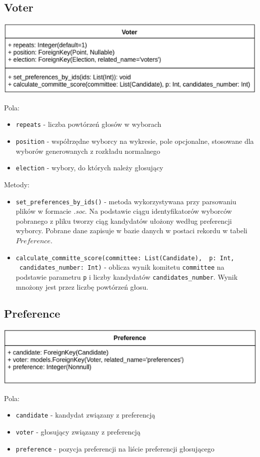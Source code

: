\documentclass[pdflatex,11pt]{../aghdoc_version2}
\newcommand{\code}[1]{\texttt{#1}}
\begin{document}
\subsection{Voter}
\begin{center}
\centerline{\includegraphics[scale=0.85]{pics/Voter.png}}
\end{center}
Pola:
\begin{itemize}
\item \code{repeats} - liczba powtórzeń głosów w wyborach
\item \code{position} - współrzędne wyborcy na wykresie, pole opcjonalne, stosowane dla wyborów
generowanych z rozkładu normalnego
\item \code{election} - wybory, do których należy głosujący
\end{itemize}
\clearpage
Metody:
\begin{itemize}
\item \code{set\_preferences\_by\_ids()} - metoda wykorzystywana przy parsowaniu plików
w formacie \textit{.soc}.
Na podstawie ciągu identyfikatorów wyborców pobranego z pliku tworzy ciąg kandydatów ułożony według preferencji wyborcy. Pobrane dane zapisuje w bazie
danych w postaci rekordu w tabeli $Preference$.
\item \code{calculate\_committe\_score(committee: List(Candidate), \ p: Int, \
candidates\_number: Int)} - oblicza wynik komitetu \code{committee} na podstawie
parametru \code{p} i liczby kandydatów \code{candidates\_number}. Wynik mnożony jest przez
liczbę powtórzeń głosu.
\end{itemize}

\subsection{Preference}
\begin{center}
\centerline{\includegraphics[scale=0.85]{pics/Preference.png}}
\end{center}
Pola:
\begin{itemize}
\item \code{candidate} - kandydat związany z preferencją
\item \code{voter} - głosujący związany z preferencją
\item \code{preference} - pozycja preferencji na liście preferencji głosującego
\end{itemize}
\end{document}
